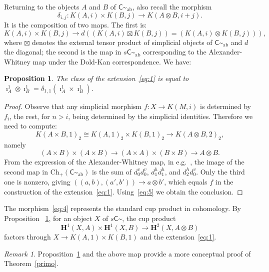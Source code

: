 \documentclass{amsart}
\numberwithin{equation}{subsection}
\newtheorem{proposition}[theorem]{Proposition}
\theoremstyle{remark}
\theoremstyle{remark}
\newtheorem*{remark*}{Remark}
\newcommand{\eg}{e.g.\xspace}
\newcommand{\too}{\longrightarrow}%
\newcommand{\C}{\mathsf{C}} %
\newcommand{\ch}{\mathrm{Ch}} %
\newcommand{\HH}{\mathbf{H}} %
\newcommand{\iso}{\cong}
\newcommand{\shC}{\C\sptilde} %
\newcommand{\shAbC}{\shC_\mathrm{ab}} %
\begin{document}
Returning to the objects $A$ and $B$ of $\shAbC$, also recall the morphism \cite[Chapter II, Equation (2.22), p.~64]{Breen}
\begin{equation}
  \label{eq:4}
  \delta_{i,j}\colon
  K(A,i)\times K(B,j) \too K(A\otimes B,i+j).
\end{equation}
It is the composition of two maps. The first is:
\begin{equation*}
  K(A,i)\times K(B,j)\too d((K(A,i)\boxtimes K(B,j)) = (K(A,i)\otimes K(B,j))),
\end{equation*}
where $\boxtimes$  denotes the external tensor product of simplicial objects of $\shAbC$ and $d$ the diagonal; the second is the map in $s\shAbC$ corresponding to the Alexander-Whitney map under the Dold-Kan correspondence. We have:
\begin{proposition}
  \label{prop:cup}
  The class of the extension~\eqref{eq:1} is equal to $\imath_A^1\otimes \imath_B^1 = \delta_{1,1}(\imath_A^1\times \imath_B^1)$.
\end{proposition}
\begin{proof}
  Observe that any simplicial morphism $f\colon X\to K(M,i)$ is determined by $f_i$, the rest, for $n>i$, being determined by the simplicial identities. Therefore we need to compute:
  \begin{equation*}
    K(A\times B,1)_2 \iso K(A,1)_2\times K(B,1)_2 \too K(A\otimes B,2)_2,
  \end{equation*}
  namely
  \begin{equation*}
    (A\times B)\times (A\times B) \too (A\times A)\times (B\times B) \too A\otimes B.
  \end{equation*}
  From the expression of the Alexander-Whitney map, in \eg\ \cite{Illusie}, the image of the second map in $\ch_+(\shAbC)$ is the sum of $d_0^vd_0^v$, $d_1^hd_1^h$, and $d_2^hd_0^v$. Only the third one is nonzero, giving $((a,b),(a',b'))\to a\otimes b'$, which equals $f$ in the construction of the extension~\eqref{eq:1}.  Using~\eqref{eq:5} we obtain the conclusion.
\end{proof}
The morphism~\eqref{eq:4} represents the standard cup product in cohomology. By Proposition ~\ref{prop:cup}, for an object $X$ of $s\shC$, the cup product
\begin{equation*}
  \HH^1(X,A)\times \HH^1(X,B) \too \HH^2(X,A\otimes B)
\end{equation*}
factors through $X\to K(A,1)\times K(B,1)$ and the extension~\eqref{eq:1}.
\begin{remark*}
  Proposition~\ref{prop:cup} and the above map provide a more conceptual proof of Theorem~\ref{primo}.
\end{remark*}
\end{document}
